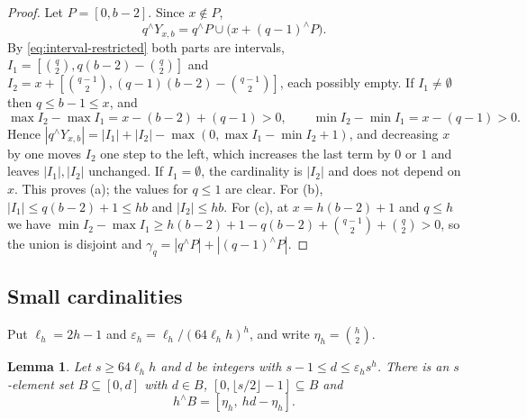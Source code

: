 \documentclass[11pt]{amsart}
\newtheorem{lemma}[theorem]{Lemma}
\theoremstyle{definition}
\theoremstyle{remark}
\numberwithin{equation}{section}
\newcommand{\res}[2]{#1^{\wedge}#2}
\begin{document}
\begin{proof}
Let $P=[0,b-2]$. Since $x\notin P$,
\[
\res qY_{x,b}=\res qP\cup\bigl(x+\res{(q-1)}P\bigr).
\]
By \eqref{eq:interval-restricted} both parts are intervals, $I_1=[\binom q2,q(b-2)-\binom q2]$ and $I_2=x+[\binom{q-1}2,(q-1)(b-2)-\binom{q-1}2]$, each possibly empty. If $I_1\neq\emptyset$ then $q\le b-1\le x$, and
\[
\max I_2-\max I_1=x-(b-2)+(q-1)>0,\qquad \min I_2-\min I_1=x-(q-1)>0.
\]
Hence $|\res qY_{x,b}|=|I_1|+|I_2|-\max(0,\max I_1-\min I_2+1)$, and decreasing $x$ by one moves $I_2$ one step to the left, which increases the last term by $0$ or $1$ and leaves $|I_1|,|I_2|$ unchanged. If $I_1=\emptyset$, the cardinality is $|I_2|$ and does not depend on $x$. This proves (a); the values for $q\le 1$ are clear. For (b), $|I_1|\le q(b-2)+1\le hb$ and $|I_2|\le hb$. For (c), at $x=h(b-2)+1$ and $q\le h$ we have $\min I_2-\max I_1\ge h(b-2)+1-q(b-2)+\binom{q-1}2+\binom q2>0$, so the union is disjoint and $\gamma_q=|\res qP|+|\res{(q-1)}P|$.
\end{proof}

\subsection{Small cardinalities}

Put $\ell_h=2h-1$ and $\varepsilon_h=\ell_h/(64\ell_hh)^h$, and write $\eta_h=\binom h2$.

\begin{lemma}\label{lem:rfill}
Let $s\ge 64\ell_hh$ and $d$ be integers with $s-1\le d\le\varepsilon_hs^h$. There is an $s$-element set $B\subseteq[0,d]$ with $d\in B$, $[0,\lfloor s/2\rfloor-1]\subseteq B$ and
\[
\res hB=[\eta_h,\ hd-\eta_h].
\]
\end{lemma}
\end{document}
